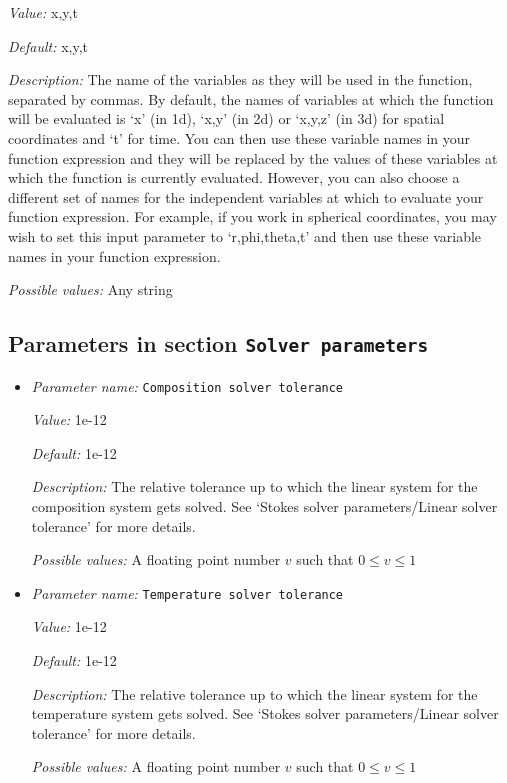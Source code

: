 \begin{itemize}
{\it Value:} x,y,t


{\it Default:} x,y,t


{\it Description:} The name of the variables as they will be used in the function, separated by commas. By default, the names of variables at which the function will be evaluated is `x' (in 1d), `x,y' (in 2d) or `x,y,z' (in 3d) for spatial coordinates and `t' for time. You can then use these variable names in your function expression and they will be replaced by the values of these variables at which the function is currently evaluated. However, you can also choose a different set of names for the independent variables at which to evaluate your function expression. For example, if you work in spherical coordinates, you may wish to set this input parameter to `r,phi,theta,t' and then use these variable names in your function expression.


{\it Possible values:} Any string
\end{itemize}

\subsection{Parameters in section \tt Solver parameters}
\label{parameters:Solver_20parameters}

\begin{itemize}
\item {\it Parameter name:} {\tt Composition solver tolerance}
\label{parameters:Solver parameters/Composition solver tolerance}


{\it Value:} 1e-12


{\it Default:} 1e-12


{\it Description:} The relative tolerance up to which the linear system for the composition system gets solved. See `Stokes solver parameters/Linear solver tolerance' for more details.


{\it Possible values:} A floating point number $v$ such that $0 \leq v \leq 1$
\item {\it Parameter name:} {\tt Temperature solver tolerance}
\label{parameters:Solver parameters/Temperature solver tolerance}


{\it Value:} 1e-12


{\it Default:} 1e-12


{\it Description:} The relative tolerance up to which the linear system for the temperature system gets solved. See `Stokes solver parameters/Linear solver tolerance' for more details.


{\it Possible values:} A floating point number $v$ such that $0 \leq v \leq 1$
\end{itemize}



